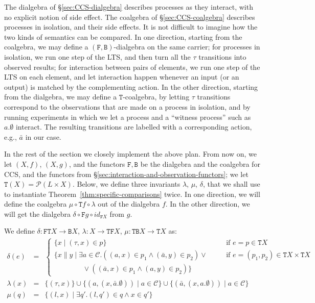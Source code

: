 \documentclass[orivec]{llncs}
\newcommand{\mF}[1]{\mathtt{#1}}
\newcommand{\F}{\mF{F}}
\newcommand{\B}{\mF{B}}
\newcommand{\T}{\mF{T}}
\newcommand{\id}{\mathit{id}}
\newcommand{\Pow}{\mathcal{P}}
\newcommand{\chan}{\mathcal{C}}
\newcommand{\defend}{}
\renewenvironment{definition}{\begin{defn}}{\defend\end{defn}}
\begin{document}
The dialgebra of \S \ref{sec:CCS-dialgebra} describes processes as they interact, with no explicit notion of side effect. The coalgebra of \S \ref{sec:CCS-coalgebra} describes processes in isolation, and their side effects.
It is not difficult to imagine how the two kinds of semantics can be compared. In one direction, starting from the coalgebra, we may define a $(\F,\B)$-dialgebra on the same carrier; for processes in isolation, we run one step of the LTS, and then turn all the $\tau$ transitions into observed results; for interaction between pairs of elements, we run one step of the LTS on each element, and let interaction happen whenever an input (or an output) is matched by the complementing action. In the other direction, starting from the dialgebra, we may define a $\T$-coalgebra, by letting $\tau$ transitions correspond to the observations that are made on a process in isolation, and by running experiments in which we let a process and a ``witness process'' such as $a.\emptyset$ interact. The resulting transitions are labelled with a corresponding action, e.g., $\bar a$ in our case. 

In the rest of the section we closely implement the above plan. From now on, we let $(X,f)$, $(X,g)$, and the functors $\F,\B$ be the dialgebra and the coalgebra for CCS, and the functors from \S \ref{sec:interaction-and-observation-functors}; we let $\T(X) = \Pow(L \times X)$. Below, we define three invariants $\lambda$, $\mu$, $\delta$, that we shall use to instantiate Theorem~\ref{thm:specific-comparisons} twice. In one direction, we will define the coalgebra $\mu \circ \T f \circ \lambda$ out of the dialgebra $f$. In the other direction, we will get the dialgebra $\delta \circ \F g \circ \id_{\F X}$ from $g$.

\begin{definition}\label{def:CCS-invariants}
	We define $\delta : \F \T X \to \B X$, $\lambda : X \to \T \F X$, $\mu : \T \B X \to \T X$ as:
	$$
	\begin{array}{rcl}
		\delta(e)  & = & \left\{ 
		    \begin{array}{lcl} 
		      \{ x \mid (\tau,x) \in p \}  & \quad & \text{if } e = p \in \T X  \\ 
		      \{ x \parallel y \mid \exists a \in \chan . 
		      			\left ((a,x) \in p_1 \land (\bar a, y) \in p_2 \right ) \lor & & \text{if } e = (p_1,p_2) \in \T X \times \T X \\
		     \qquad \qquad \lor \left ( (\bar a,x) \in p_1 \land (a, y) \in p_2 \right ) \}
		      \end{array} \right. \\
	    \lambda(x) & = & \{ (\tau, x) \} \cup \{ (a,(x,\bar a . \emptyset)) \mid a \in \chan  \} 
	    			\cup \{ (\bar a,(x,a . \emptyset)) \mid a \in \chan \} \\
	    \mu (q) & = & \{ (l,x) \mid \exists q' . (l,q') \in q \land x \in q' \}
	\end{array} 
	$$
\end{definition}
\end{document}
